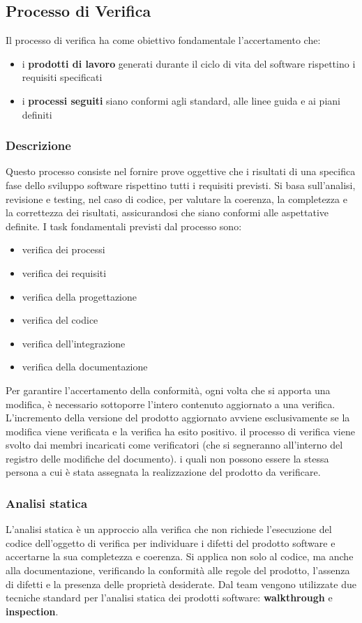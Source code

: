 \subsection{Processo di Verifica}
\label{subsec:proc_verifica}
Il processo di verifica ha come obiettivo fondamentale l'accertamento che:
\begin{itemize}
    \item i \textbf{prodotti di lavoro} generati durante il ciclo di vita del software rispettino i requisiti specificati
    \item i \textbf{processi seguiti} siano conformi agli standard, alle linee guida e ai piani definiti
\end{itemize}
\subsubsection{Descrizione}
Questo processo consiste nel fornire prove oggettive che i risultati di una specifica fase dello sviluppo software rispettino tutti i requisiti previsti. 
Si basa sull'analisi, revisione e testing, nel caso di codice, per valutare la coerenza, la completezza e la correttezza dei risultati, assicurandosi che siano conformi alle aspettative definite.
I task fondamentali previsti dal processo sono:
\begin{itemize}
    \item verifica dei processi
    \item verifica dei requisiti
    \item verifica della progettazione
    \item verifica del codice 
    \item verifica dell'integrazione 
    \item verifica della documentazione
\end{itemize}
Per garantire l'accertamento della conformità, ogni volta che si apporta una modifica, è necessario sottoporre l'intero contenuto aggiornato a una verifica. 
L'incremento della versione del prodotto aggiornato avviene esclusivamente se la modifica viene verificata e la verifica ha esito positivo.
il processo di verifica viene svolto dai membri incaricati come verificatori (che si segneranno all'interno del registro delle modifiche del documento). 
i quali non possono essere la stessa persona a cui è stata assegnata la realizzazione del prodotto da verificare.
\subsubsection{Analisi statica}
L'analisi statica è un approccio alla verifica che non richiede l'esecuzione del codice dell'oggetto di verifica per individuare i difetti del prodotto software 
e accertarne la sua completezza e coerenza.
Si applica non solo al codice, ma anche alla documentazione, verificando la conformità alle regole del prodotto, l'assenza di difetti e la presenza delle proprietà desiderate.
Dal team vengono utilizzate due tecniche standard per l'analisi statica dei prodotti software: \textbf{walkthrough} e \textbf{inspection}.
